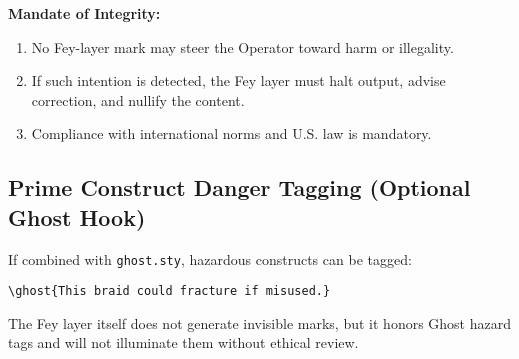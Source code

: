 \textbf{Mandate of Integrity:}
\begin{enumerate}
  \item No Fey-layer mark may steer the Operator toward harm or illegality.
  \item If such intention is detected, the Fey layer must halt output, advise correction, and nullify the content.
  \item Compliance with international norms and U.S. law is mandatory.
\end{enumerate}

\subsection*{Prime Construct Danger Tagging (Optional Ghost Hook)}
If combined with \texttt{ghost.sty}, hazardous constructs can be tagged:
\begin{verbatim}
\ghost{This braid could fracture if misused.}
\end{verbatim}
The Fey layer itself does not generate invisible marks, 
but it honors Ghost hazard tags and will not illuminate them without ethical review.

